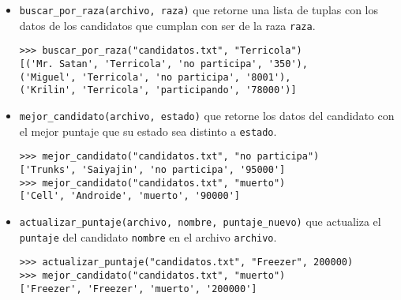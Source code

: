 \begin{itemize}
    \item \texttt{buscar\_por\_raza(archivo, raza)} que retorne una lista de tuplas con los datos de los candidatos que cumplan con ser de la raza \texttt{raza}.
    
    \begin{lstlisting}[style=consola]
>>> buscar_por_raza("candidatos.txt", "Terricola")
[('Mr. Satan', 'Terricola', 'no participa', '350'), 
('Miguel', 'Terricola', 'no participa', '8001'), 
('Krilin', 'Terricola', 'participando', '78000')]
    \end{lstlisting}
    
    \item \texttt{mejor\_candidato(archivo, estado)} que retorne los datos del candidato con el mejor puntaje que su estado sea distinto a \texttt{estado}.
    
    \begin{lstlisting}[style=consola]
>>> mejor_candidato("candidatos.txt", "no participa")
['Trunks', 'Saiyajin', 'no participa', '95000']
>>> mejor_candidato("candidatos.txt", "muerto")
['Cell', 'Androide', 'muerto', '90000']
    \end{lstlisting}

    \item \texttt{actualizar\_puntaje(archivo, nombre, puntaje\_nuevo)} que actualiza el \texttt{puntaje} del candidato \texttt{nombre} en el archivo \texttt{archivo}.

    \begin{lstlisting}[style=consola]
>>> actualizar_puntaje("candidatos.txt", "Freezer", 200000)
>>> mejor_candidato("candidatos.txt", "muerto")
['Freezer', 'Freezer', 'muerto', '200000']
    \end{lstlisting}

\end{itemize}
